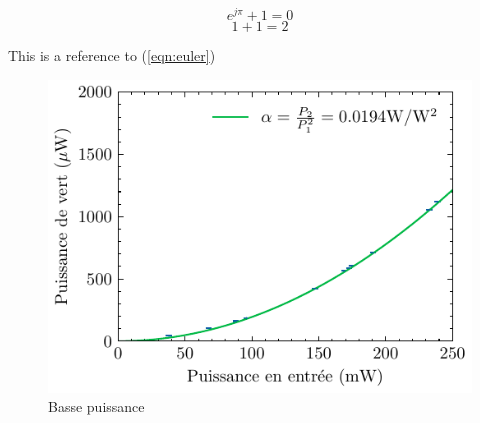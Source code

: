 \documentclass[a4paper]{article}
\begin{document}
\begin{equation}
	e^{j\pi} + 1 = 0
	\label{eqn:euler}
\end{equation}
\begin{equation}
	1+1=2
	\label{eqn:simple}
\end{equation}

This is a reference to (\ref{eqn:euler})

\begin{figure}[h]
	\centering
	\includegraphics{../donnees/conversion basse puissance 82.5 C.pdf}
	\caption{Basse puissance}
	\label{fig:bp}
\end{figure}
\end{document}

